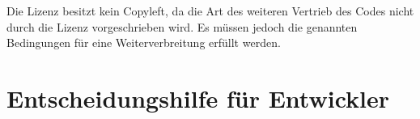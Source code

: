 Die Lizenz besitzt kein Copyleft, da die Art des weiteren Vertrieb des Codes nicht durch die Lizenz vorgeschrieben wird. Es m\"ussen jedoch die genannten Bedingungen f\"ur eine Weiterverbreitung erf\"ullt werden.

\section{Entscheidungshilfe f\"ur Entwickler}
